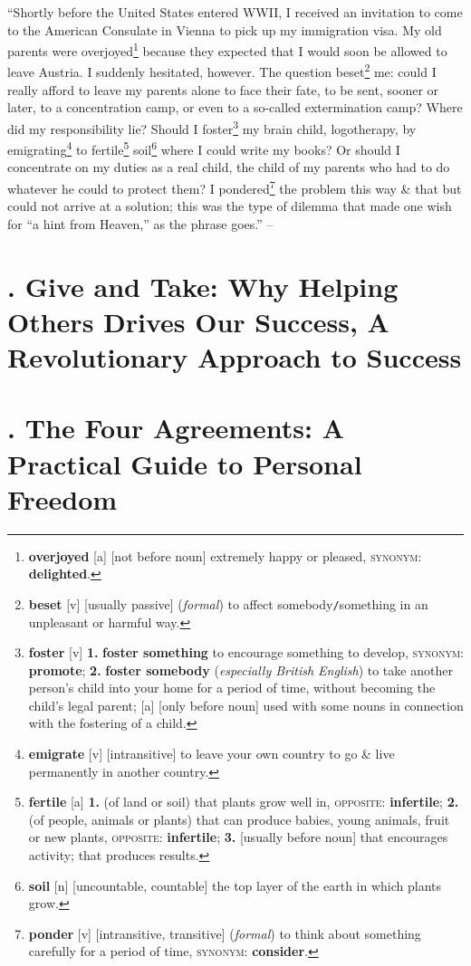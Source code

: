 \documentclass[oneside]{book}
\numberwithin{equation}{section}
\begin{document}
\begin{enumerate}[leftmargin=0mm]
	``Shortly before the United States entered WWII, I received an invitation to come to the American Consulate in Vienna to pick up my immigration visa. My old parents were overjoyed\footnote{\textbf{overjoyed} [a] [not before noun] extremely happy or pleased, \textsc{synonym}: \textbf{delighted}.} because they expected that I would soon be allowed to leave Austria. I suddenly hesitated, however. The question beset\footnote{\textbf{beset} [v] [usually passive] (\textit{formal}) to affect somebody\texttt{/}something in an unpleasant or harmful way.} me: could I really afford to leave my parents alone to face their fate, to be sent, sooner or later, to a concentration camp, or even to a so-called extermination camp? Where did my responsibility lie? Should I foster\footnote{\textbf{foster} [v] \textbf{1.} \textbf{foster something} to encourage something to develop, \textsc{synonym}: \textbf{promote}; \textbf{2.} \textbf{foster somebody} (\textit{especially British English}) to take another person's child into your home for a period of time, without becoming the child's legal parent; [a] [only before noun] used with some nouns in connection with the fostering of a child.} my brain child, logotherapy, by emigrating\footnote{\textbf{emigrate} [v] [intransitive] to leave your own country to go \& live permanently in another country.} to fertile\footnote{\textbf{fertile} [a] \textbf{1.} (of land or soil) that plants grow well in, \textsc{opposite}: \textbf{infertile}; \textbf{2.} (of people, animals or plants) that can produce babies, young animals, fruit or new plants, \textsc{opposite}: \textbf{infertile}; \textbf{3.} [usually before noun] that encourages activity; that produces results.} soil\footnote{\textbf{soil} [n] [uncountable, countable] the top layer of the earth in which plants grow.} where I could write my books? Or should I concentrate on my duties as a real child, the child of my parents who had to do whatever he could to protect them? I pondered\footnote{\textbf{ponder} [v] [intransitive, transitive] (\textit{formal}) to think about something carefully for a period of time, \textsc{synonym}: \textbf{consider}.} the problem this way \& that but could not arrive at a solution; this was the type of dilemma that made one wish for ``a hint from Heaven,'' as the phrase goes.'' -- \cite[Preface to the 1992 Edition, p. 13]{Frankl2013}
\end{enumerate}


\chapter{\cite{Grant2013, Grant2022}. Give and Take: Why Helping Others Drives Our Success, A Revolutionary Approach to Success}


\chapter{\cite{Ruiz2011}. The Four Agreements: A Practical Guide to Personal Freedom}


\printbibliography[heading=bibintoc]
	
\end{document}
